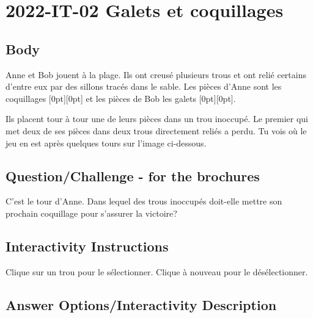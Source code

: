 \documentclass[a4paper,11pt]{report}
\newcommand{\taskGraphicsFolder}{..}
\begin{document}
\section*{\centering{} 2022-IT-02 Galets et coquillages}


\subsection*{Body}

Anne et Bob jouent à la plage. Ils ont creusé plusieurs trous et ont relié certains d’entre eux par des sillons tracés dans le sable. Les pièces d’Anne sont les coquillages \raisebox{-0.5ex}[0pt][0pt]{} et les pièces de Bob les galets \raisebox{-0.5ex}[0pt][0pt]{}.

Ils placent tour à tour une de leurs pièces dans un trou inoccupé. Le premier qui met deux de ses pièces dans deux trous directement reliés a perdu. Tu vois où le jeu en est après quelques tours sur l’image ci-dessous.

{\centering%
\par}

{\em


\subsection*{Question/Challenge - for the brochures}

C’est le tour d’Anne. Dans lequel des trous inoccupés doit-elle mettre son prochain coquillage pour s’assurer la victoire?

}


\subsection*{Interactivity Instructions}

Clique sur un trou pour le sélectionner. Clique à nouveau pour le désélectionner.

\begingroup
\renewcommand{\arraystretch}{1.5}
\subsection*{Answer Options/Interactivity Description}
\end{document}
